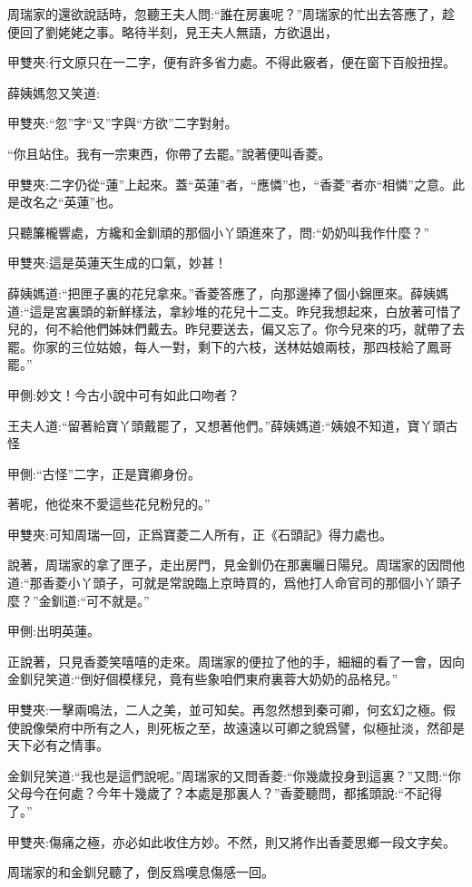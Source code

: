 \begin{parag}
    周瑞家的還欲說話時，忽聽王夫人問:“誰在房裏呢？”周瑞家的忙出去答應了，趁便回了劉姥姥之事。略待半刻，見王夫人無語，方欲退出，\begin{note}甲雙夾:行文原只在一二字，便有許多省力處。不得此竅者，便在窗下百般扭捏。\end{note}薛姨媽忽又笑道:\begin{note}甲雙夾:“忽”字“又”字與“方欲”二字對射。\end{note}“你且站住。我有一宗東西，你帶了去罷。”說著便叫香菱。\begin{note}甲雙夾:二字仍從“蓮”上起來。蓋“英蓮”者，“應憐”也，“香菱”者亦“相憐”之意。此是改名之“英蓮”也。\end{note}只聽簾櫳響處，方纔和金釧頑的那個小丫頭進來了，問:“奶奶叫我作什麼？”\begin{note}甲雙夾:這是英蓮天生成的口氣，妙甚！\end{note}薛姨媽道:“把匣子裏的花兒拿來。”香菱答應了，向那邊捧了個小錦匣來。薛姨媽道:“這是宮裏頭的新鮮樣法，拿紗堆的花兒十二支。昨兒我想起來，白放著可惜了兒的，何不給他們姊妹們戴去。昨兒要送去，偏又忘了。你今兒來的巧，就帶了去罷。你家的三位姑娘，每人一對，剩下的六枝，送林姑娘兩枝，那四枝給了鳳哥罷。”\begin{note}甲側:妙文！今古小說中可有如此口吻者？\end{note}王夫人道:“留著給寶丫頭戴罷了，又想著他們。”薛姨媽道:“姨娘不知道，寶丫頭古怪\begin{note}甲側:“古怪”二字，正是寶卿身份。\end{note}著呢，他從來不愛這些花兒粉兒的。”\begin{note}甲雙夾:可知周瑞一回，正爲寶菱二人所有，正《石頭記》得力處也。\end{note}
\end{parag}


\begin{parag}
    說著，周瑞家的拿了匣子，走出房門，見金釧仍在那裏曬日陽兒。周瑞家的因問他道:“那香菱小丫頭子，可就是常說臨上京時買的，爲他打人命官司的那個小丫頭子麼？”金釧道:“可不就是。”\begin{note}甲側:出明英蓮。\end{note}正說著，只見香菱笑嘻嘻的走來。周瑞家的便拉了他的手，細細的看了一會，因向金釧兒笑道:“倒好個模樣兒，竟有些象咱們東府裏蓉大奶奶的品格兒。”\begin{note}甲雙夾:一擊兩鳴法，二人之美，並可知矣。再忽然想到秦可卿，何玄幻之極。假使說像榮府中所有之人，則死板之至，故遠遠以可卿之貌爲譬，似極扯淡，然卻是天下必有之情事。\end{note}金釧兒笑道:“我也是這們說呢。”周瑞家的又問香菱:“你幾歲投身到這裏？”又問:“你父母今在何處？今年十幾歲了？本處是那裏人？”香菱聽問，都搖頭說:“不記得了。”\begin{note}甲雙夾:傷痛之極，亦必如此收住方妙。不然，則又將作出香菱思鄉一段文字矣。\end{note}周瑞家的和金釧兒聽了，倒反爲嘆息傷感一回。
\end{parag}


